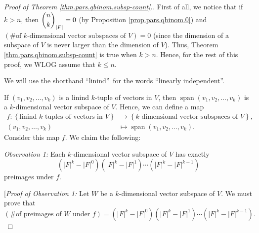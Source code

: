 \begin{proof}
[Proof of Theorem \ref{thm.pars.qbinom.subsp-count}.]First of all, we notice
that if $k>n$, then $\dbinom{n}{k}_{\left\vert F\right\vert }=0$ (by
Proposition \ref{prop.pars.qbinom.0}) and $\left(  \text{\# of }%
k\text{-dimensional vector subspaces of }V\right)  =0$ (since the dimension of
a subspace of $V$ is never larger than the dimension of $V$). Thus, Theorem
\ref{thm.pars.qbinom.subsp-count} is true when $k>n$. Hence, for the rest of
this proof, we WLOG assume that $k\leq n$.

We will use the shorthand \textquotedblleft linind\textquotedblright\ for the
words \textquotedblleft linearly independent\textquotedblright.

If $\left(  v_{1},v_{2},\ldots,v_{k}\right)  $ is a linind $k$-tuple of
vectors in $V$, then $\operatorname*{span}\left(  v_{1},v_{2},\ldots
,v_{k}\right)  $ is a $k$-dimensional vector subspace of $V$. Hence, we can
define a map%
\begin{align*}
f:\left\{  \text{linind }k\text{-tuples of vectors in }V\right\}   &
\rightarrow\left\{  k\text{-dimensional vector subspaces of }V\right\}  ,\\
\left(  v_{1},v_{2},\ldots,v_{k}\right)   &  \mapsto\operatorname*{span}%
\left(  v_{1},v_{2},\ldots,v_{k}\right)  .
\end{align*}
Consider this map $f$. We claim the following:

\begin{statement}
\textit{Observation 1:} Each $k$-dimensional vector subspace of $V$ has
exactly%
\[
\left(  \left\vert F\right\vert ^{k}-\left\vert F\right\vert ^{0}\right)
\left(  \left\vert F\right\vert ^{k}-\left\vert F\right\vert ^{1}\right)
\cdots\left(  \left\vert F\right\vert ^{k}-\left\vert F\right\vert
^{k-1}\right)
\]
preimages under $f$.
\end{statement}

[\textit{Proof of Observation 1:} Let $W$ be a $k$-dimensional vector subspace
of $V$. We must prove that
\[
\left(  \text{\# of preimages of }W\text{ under }f\right)  =\left(  \left\vert
F\right\vert ^{k}-\left\vert F\right\vert ^{0}\right)  \left(  \left\vert
F\right\vert ^{k}-\left\vert F\right\vert ^{1}\right)  \cdots\left(
\left\vert F\right\vert ^{k}-\left\vert F\right\vert ^{k-1}\right)  .
\]



\end{proof}
